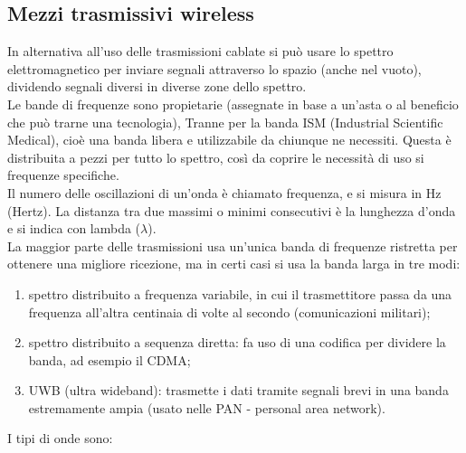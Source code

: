 \documentclass[10pt,a4paper,twoside]{article}
\begin{document}
\subsection{Mezzi trasmissivi wireless}
In alternativa all'uso delle trasmissioni cablate si può usare lo spettro elettromagnetico per inviare segnali attraverso lo spazio (anche nel vuoto), dividendo segnali diversi in diverse zone dello spettro.\\
Le bande di frequenze sono propietarie (assegnate in base a un'asta o al beneficio che può trarne una tecnologia), Tranne per la banda ISM (Industrial Scientific Medical), cioè una banda libera e utilizzabile da chiunque ne necessiti. Questa è distribuita a pezzi per tutto lo spettro, così da coprire le necessità di uso si frequenze specifiche.\\
Il numero delle oscillazioni di un'onda è chiamato frequenza, e si misura in Hz (Hertz). La distanza tra due massimi o minimi consecutivi è la lunghezza d'onda e si indica con lambda ($\lambda$).\\
La maggior parte delle trasmissioni usa un'unica banda di frequenze ristretta per ottenere una migliore ricezione, ma in certi casi si usa la banda larga in tre modi:
\begin{enumerate}
\item spettro distribuito a frequenza variabile, in cui il trasmettitore passa da una frequenza all'altra centinaia di volte al secondo (comunicazioni militari);
\item spettro distribuito a sequenza diretta: fa uso di una codifica per dividere la banda, ad esempio il CDMA;
\item UWB (ultra wideband): trasmette i dati tramite segnali brevi in una banda estremamente ampia (usato nelle PAN - personal area network).
\end{enumerate}
I tipi di onde sono:
\end{document}
